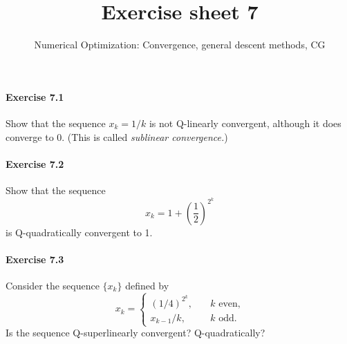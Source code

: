 
\title{Exercise sheet 7}
\subtitle{Numerical Optimization: Convergence, general descent methods, CG}
\usepackage{algorithm} %
\usepackage{algpseudocode}

\maketitle

\paragraph{Exercise 7.1} %
Show that the sequence $x_k=1/k$ is not Q-linearly convergent, although it does converge to $0$. (This is called \emph{sublinear convergence.})

\paragraph{Exercise 7.2} %
Show that the sequence
\[
x_k = 1 + \left(\frac{1}{2}\right)^{2^k}
\]
is Q-quadratically convergent to 1.



\paragraph{Exercise 7.3} %
Consider the sequence $\{x_k\}$ defined by
\[
x_k =
\begin{cases}
(1/4)^{2^k},\quad&k\text{ even,}\\
x_{k-1}/k,\quad&k\text{ odd.}
\end{cases}
\]
Is the sequence Q-superlinearly convergent? Q-quadratically?

